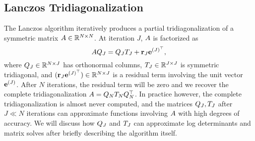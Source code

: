 

\subsection{Lanczos Tridiagonalization}
\label{sec:lanczos}

The Lanczos algorithm \cite{lanczos1950iteration} iteratively produces a partial tridiagonalization of a symmetric matrix $A \in \mathbb{R}^{N \times N}$.
At iteration $J$, $A$ is factorized as
%
\begin{equation}
  A Q_J = Q_J T_J + \mathbf{r}_J \mathbf{e}^{(J)^\top},
  \label{eqn:lanczos}
\end{equation}
%
where $Q_J \in \mathbb{R}^{N \times J}$ has orthonormal columns, $T_J \in \mathbb{R}^{J \times J}$ is symmetric tridiagonal, and $(\mathbf{r}_J \mathbf{e}^{(J)^\top}) \in \mathbb{R}^{N \times J}$ is a residual term involving the unit vector $\mathbf{e}^{(J)}$.
After $N$ iterations, the residual term will be zero and we recover the complete tridiagonalization $A = Q_N T_N Q^\top_N$.
In practice however, the complete tridiagonalization is almost never computed, and the matrices $Q_J, T_J$ after $J \ll N$ iterations can approximate functions involving $A$ with high degrees of accuracy.
We will discuss how $Q_J$ and $T_J$ can approximate log determinants and matrix solves after briefly describing the algorithm itself.

